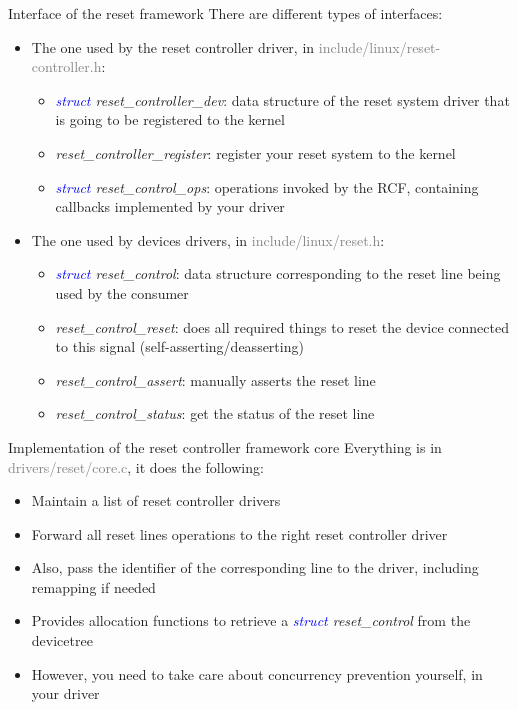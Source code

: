 \documentclass{beamer}
\begin{document}
\begin{frame}{Interface of the reset framework}
	There are different types of interfaces:
	\begin{itemize}
		\item The one used by the reset controller driver, in \textcolor{gray}{include/linux/reset-controller.h}:
			\begin{itemize}
				\item \textit{\textcolor{blue}{struct} reset\_controller\_dev}: data structure of the reset system driver that is going to be registered to the kernel
				\item \textit{reset\_controller\_register}: register your reset system to the kernel
				\item \textit{\textcolor{blue}{struct} reset\_control\_ops}: operations invoked by the RCF, containing callbacks implemented by your driver
			\end{itemize}
	\end{itemize}
	\begin{itemize}
		\item The one used by devices drivers, in \textcolor{gray}{include/linux/reset.h}:
			\begin{itemize}
				\item \textit{\textcolor{blue}{struct} reset\_control}: data structure corresponding to the reset line being used by the consumer
				\item \textit{reset\_control\_reset}: does all required things to reset the device connected to this signal (self-asserting/deasserting)
				\item \textit{reset\_control\_assert}: manually asserts the reset line
				\item \textit{reset\_control\_status}: get the status of the reset line
			\end{itemize}
	\end{itemize}
\end{frame}

\begin{frame}{Implementation of the reset controller framework core}
	Everything is in \textcolor{gray}{drivers/reset/core.c}, it does the following:
	\begin{itemize}
		\item Maintain a list of reset controller drivers
		\item Forward all reset lines operations to the right reset controller driver
		\item Also, pass the identifier of the corresponding line to the driver, including remapping if needed
		\item Provides allocation functions to retrieve a \textit{\textcolor{blue}{struct} reset\_control} from the devicetree
		\item However, you need to take care about concurrency prevention yourself, in your driver
	\end{itemize}
\end{frame}
\end{document}
